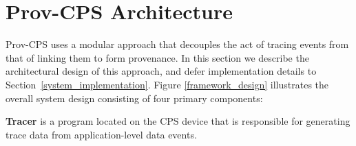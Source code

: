 %
%
%
%
%
%
%
%
% 
%

\section{Prov-CPS Architecture}
Prov-CPS uses a modular approach that decouples the act of tracing events from that of linking them to form provenance. In this section we describe the architectural design of this approach, and defer implementation details to Section~\ref{system_implementation}.  Figure \ref{framework_design} illustrates the overall system design consisting of four primary components:

 
 \textbf{Tracer} is a program located on the CPS device that is responsible for generating trace data from application-level data events. 
  
